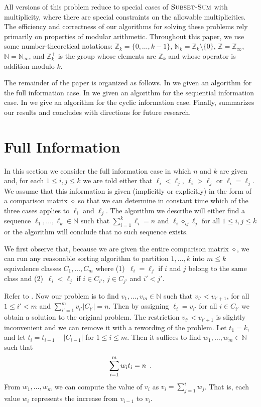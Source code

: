 \documentclass{elsart}
\newcommand{\Z}{\mathbb{Z}}
\newcommand{\N}{\mathbb{N}}
\newcommand{\defeq}{=}
\newcommand{\op}{\diamond}
\newcommand{\opij}{\op_{ij}}
\begin{document}
All versions of this problem reduce to special cases of
$\textsc{Subset-Sum}$ with multiplicity, where there are special
constraints on the allowable multiplicities.  The efficiency and
correctness of our algorithms for solving these problems rely
primarily on properties of modular arithmetic. Throughout this paper,
we use some number-theoretical notations: $\Z_k\defeq
\{0,\ldots,k-1\}$, $\N_k\defeq\Z_k\setminus\{0\}$,
$\Z\defeq\Z_\infty$, $\N\defeq\N_\infty$, and $\Z_k^+$ is the group
whose elements are $\Z_k$ and whose operator is addition modulo $k$.

The remainder of the paper is organized as follows.  In
 we given an algorithm for the full
information case.  In  we given an
algorithm for the sequential information case.  In
 we give an algorithm for the cyclic
information case. Finally,  summarizes our results
and concludes with directions for future research.

\section{Full Information}

In this section we consider the full information case in which $n$ and
$k$ are given and, for each $1\le i,j \le k$ we are told either that
$\ell_i< \ell_j$, $\ell_i > \ell_j$ or $\ell_i = \ell_j$.  We assume
that this information is given (implicitly or explicitly) in the form
of a comparison matrix $\op$ so that we can determine in constant time
which of the three cases applies to $\ell_i$ and $\ell_j$.  The
algorithm we describe will either find a sequence
$\ell_1,\ldots,\ell_k\in\N$ such that $\sum_{i=1}^k\ell_i = n$ and
$\ell_i\opij\ell_j$ for all $1\le i,j\le k$ or the algorithm will
conclude that no such sequence exists.

We first observe that, because we are given the entire comparison
matrix $\op$, we can run any reasonable sorting algorithm to partition
$1,\ldots,k$ into  $m\le k$ equivalence classes $C_1,\ldots,C_{m}$
where (1)~$\ell_i = \ell_j$ if $i$ and $j$ belong to the same class and
(2)~$\ell_i < \ell_j$ if $i\in C_{i'}$, $j\in C_{j'}$ and $i'< j'$.

Refer to .  Now our problem is to find
$v_1,\ldots,v_{m}\in\N$ such that $v_{i'} < v_{i'+1}$, for all $1\le
i' <
m$ and $\sum_{i'=1}^m{v_{i'}|C_{i'}|} = n$.  Then by assigning $\ell_i=v_{i'}$
for all $i\in C_{i'}$ we obtain a solution to the original problem.
The restriction $v_{i'} < v_{i'+1}$ is slightly inconvenient and we
can remove it with a rewording of the problem.  Let $t_1 = k$,
 and let $t_i=t_{i-1}-|C_{i-1}|$ for $1\le i\le m$.  Then
it suffices to find $w_1,\ldots,w_m\in\N$ such that
\begin{equation}
       \sum_{i=1}^m w_it_i = n \enspace . \eqlabel{wis}
\end{equation}
From $w_1,\ldots, w_m$ we can compute the value of $v_i$ as 
$v_i=\sum_{j=1}^i w_j$.  That is, each value $w_i$
represents the increase from $v_{i-1}$ to $v_i$.
\end{document}
